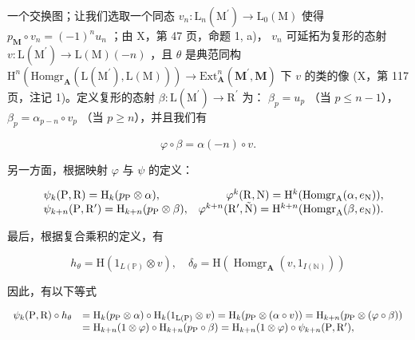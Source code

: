 一个交换图；让我们选取一个同态 \(v_{n}: \mathrm{L}_{n}(\mathrm{M}^{\prime}) \to \mathrm{L}_{0}(\mathrm{M})\) 使得 \(p_{\mathbf{M}} \circ v_{n} = (-1)^{n} u_{n}\) ；由 X，第 47 页，命题 1, a)， \(v_{n}\) 可延拓为复形的态射 \(v: \mathrm{L}(\mathrm{M}^{\prime}) \to \mathrm{L}(\mathrm{M})(-n)\) ，且 \(\theta\) 是典范同构 \(\mathrm{H}^{n}(\mathrm{Homgr}_{\mathbf{A}}(\mathrm{L}(\mathrm{M}^{\prime}), \mathrm{L}(\mathrm{M}))) \to \mathrm{Ext}_{\mathbf{A}}^{n}(\mathbf{M}^{\prime}, \mathbf{M})\) 下 \(v\) 的类的像 (X，第 117 页，注记 1)。定义复形的态射 \(\beta: \mathrm{L}(\mathrm{M}^{\prime}) \to \mathrm{R}^{\prime}\) 为： \(\beta_{p} = u_{p}\) （当 \(p \leqslant n - 1\)）， \(\beta_{p} = \alpha_{p-n} \circ v_{p}\) （当 \(p \geqslant n\)），并且我们有

\[
\varphi \circ \beta = \alpha (- n) \circ v.
\]

另一方面，根据映射 \(\varphi\) 与 \(\psi\) 的定义：

\[
\begin{array}{r l r} & {\psi_ {k} (\mathrm{P}, \mathrm{R}) = \mathrm{H} _ {k} (p _ {\mathrm{P}} \otimes \alpha),} & {\varphi^ {k} (\mathrm{R}, \mathrm{N}) = \mathrm{H} ^ {k} (\mathrm{Homgr} _ {\mathrm{A}} (\alpha , e _ {\mathrm{N}})),} \\ & {\psi_ {k + n} (\mathrm{P}, \mathrm{R} ^ {\prime}) = \mathrm{H} _ {k + n} (p _ {\mathrm{P}} \otimes \beta),} & {\varphi^ {k + n} (\mathrm{R} ^ {\prime}, \tilde {\mathrm{N}}) = \mathrm{H} ^ {k + n} (\mathrm{Homgr} _ {\mathrm{A}} (\beta , e _ {\mathrm{N}})).} \end{array}
\]

最后，根据复合乘积的定义，有

\[
h _ {\theta} = \mathrm{H} (1 _ {L (\mathbb {P})} \otimes v), \quad \delta_ {\theta} = \mathrm{H} (\operatorname{Homgr} _ {\mathbf {A}} (v, 1 _ {I (\mathbb {N})}))
\]

因此，有以下等式

\[
\begin{array}{r l} \psi_ {k} (\mathrm{P}, \mathrm{R}) \circ h _ {\theta} & = \mathrm{H} _ {k} (p _ {\mathrm{P}} \otimes \alpha) \circ \mathrm{H} _ {k} (1 _ {\mathrm{L(P)}} \otimes v) = \mathrm{H} _ {k} (p _ {\mathrm{P}} \otimes (\alpha \circ v)) = \mathrm{H} _ {k + n} (p _ {\mathrm{P}} \otimes (\varphi \circ \beta)) \\ & = \mathrm{H} _ {k + n} (1 \otimes \varphi) \circ \mathrm{H} _ {k + n} (p _ {\mathrm{P}} \circ \beta) = \mathrm{H} _ {k + n} (1 \otimes \varphi) \circ \psi_ {k + n} (\mathrm{P}, \mathrm{R} ^ {\prime}), \end{array}
\]


